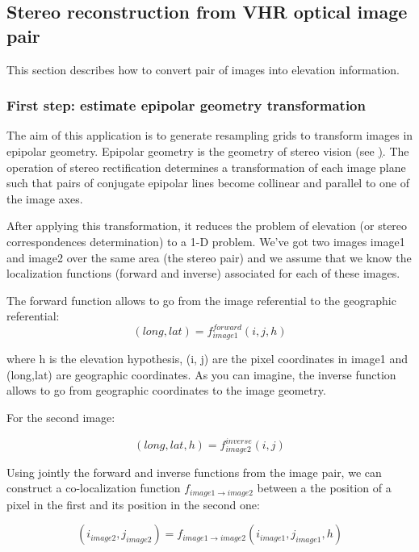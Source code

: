 \subsection{Stereo reconstruction from VHR optical image pair}\label{sec:stereoreconstruction}

This section describes how to convert pair of images into elevation information.

\subsubsection{First step: estimate epipolar geometry transformation}\label{ssec:epipolar}
The aim of this application is to generate resampling grids to transform images
in epipolar geometry.  Epipolar geometry is the geometry of stereo vision (see
\href{http://en.wikipedia.org/wiki/Epipolar_geometry}). The operation of stereo
rectification determines a transformation of each image plane such that pairs of
conjugate epipolar lines become collinear and parallel to one of the image axes.

After applying this transformation, it reduces the problem of elevation (or
stereo correspondences determination) to a 1-D problem.  We've got two images
image1 and image2 over the same area (the stereo pair) and we assume that we
know the localization functions (forward and inverse) associated for each of
these images.

The forward function allows to go from the image referential to the geographic
referential:
\begin{equation}
  (long,lat) = f^{forward}_{image1}(i,j,h)
\end{equation}

where h is the elevation hypothesis, (i, j) are the pixel coordinates in image1
and (long,lat) are geographic coordinates.  As you can imagine, the inverse
function allows to go from geographic coordinates to the image geometry.

For the second image:

\begin{equation}
   (long,lat,h) = f^{inverse}_{image2}(i,j)
\end{equation}

Using jointly the forward and inverse functions from the image pair, we can
construct a co-localization function $f_{image1 \rightarrow image2}$ between a
the position of a pixel in the first and its position in the second one:

\begin{equation}
(i_{image2},j_{image2}) = f_{image1 \rightarrow image2} (i_{image1} , j_{image1} , h)
\end{equation}

